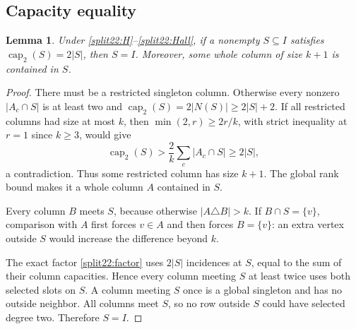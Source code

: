\documentclass[11pt,a4paper]{article}
\newtheorem{lemma}[theorem]{Lemma}
\theoremstyle{definition}\newtheorem{definition}[theorem]{Definition}
\theoremstyle{remark}\newtheorem{remark}[theorem]{Remark}
\begin{document}
\subsection{Capacity equality}

\begin{lemma}\label{split22:proper}
Under \eqref{split22:H}--\eqref{split22:Hall}, if a nonempty $S\subseteq I$ satisfies
$\operatorname{cap}_2(S)=2|S|$, then $S=I$. Moreover, some whole column of size $k+1$
is contained in $S$.
\end{lemma}
\begin{proof}
There must be a restricted singleton column. Otherwise every nonzero
$|A_c\cap S|$ is at least two and
$\operatorname{cap}_2(S)=2|N(S)|\geq2|S|+2$.
If all restricted columns had size at most $k$, then
$\min(2,r)\geq2r/k$, with strict inequality at $r=1$ since $k\geq3$,
would give
\[
 \operatorname{cap}_2(S)>\frac2k\sum_c|A_c\cap S|\geq2|S|,
\]
a contradiction. Thus some restricted column has size $k+1$. The global
rank bound makes it a whole column $A$ contained in $S$.

Every column $B$ meets $S$, because otherwise $|A\triangle B|>k$.
If $B\cap S=\{v\}$, comparison with $A$ first forces $v\in A$ and then
forces $B=\{v\}$: an extra vertex outside $S$ would increase the difference
beyond $k$.

The exact factor \eqref{split22:factor} uses $2|S|$ incidences at $S$, equal to the
sum of their column capacities. Hence every column meeting $S$ at least
twice uses both selected slots on $S$. A column meeting $S$ once is a global
singleton and has no outside neighbor. All columns meet $S$, so no row
outside $S$ could have selected degree two. Therefore $S=I$.
\end{proof}
\end{document}
